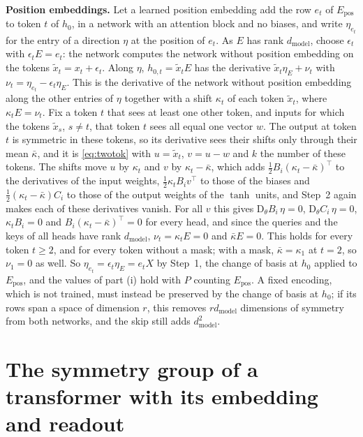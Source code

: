 \documentclass[10pt]{article}
\theoremstyle{definition}
\theoremstyle{remark}
\newcommand{\dm}{d_{\mathrm{model}}}
\newcommand{\Der}{\mathrm{D}}
\newcommand{\para}[1]{\smallskip\noindent\textbf{#1}\hspace{0.5em}}
\begin{document}
\para{Position embeddings.} Let a learned position embedding add the row $e_t$ of $E_{\mathrm{pos}}$ to token $t$ of $h_0$, in a network with an attention block and no biases, and write $\eta_{e_t}$ for the entry of a direction $\eta$ at the position of $e_t$. As $E$ has rank $\dm$, choose $\epsilon_t$ with $\epsilon_tE = e_t$: the network computes the network without position embedding on the tokens $\tilde x_t = x_t + \epsilon_t$. Along $\eta$, $h_{0,t} = \tilde x_tE$ has the derivative $\tilde x_t\eta_E + \nu_t$ with $\nu_t = \eta_{e_t} - \epsilon_t\eta_E$. This is the derivative of the network without position embedding along the other entries of $\eta$ together with a shift $\kappa_t$ of each token $\tilde x_t$, where $\kappa_tE = \nu_t$. Fix a token $t$ that sees at least one other token, and inputs for which the tokens $\tilde x_s$, $s \neq t$, that token $t$ sees all equal one vector $w$. The output at token $t$ is symmetric in these tokens, so its derivative sees their shifts only through their mean $\bar\kappa$, and it is \cref{eq:twotok} with $u = \tilde x_t$, $v = u - w$ and $k$ the number of these tokens. The shifts move $u$ by $\kappa_t$ and $v$ by $\kappa_t - \bar\kappa$, which adds $\tfrac12B_i(\kappa_t - \bar\kappa)^\top$ to the derivatives of the input weights, $\tfrac12\kappa_tB_iv^\top$ to those of the biases and $\tfrac12(\kappa_t - \bar\kappa)C_i$ to those of the output weights of the $\tanh$ units, and Step~2 again makes each of these derivatives vanish. For all $v$ this gives $\Der_\theta B_i\,\eta = 0$, $\Der_\theta C_i\,\eta = 0$, $\kappa_tB_i = 0$ and $B_i(\kappa_t - \bar\kappa)^\top = 0$ for every head, and since the queries and the keys of all heads have rank $\dm$, $\nu_t = \kappa_tE = 0$ and $\bar\kappa E = 0$. This holds for every token $t \ge 2$, and for every token without a mask; with a mask, $\bar\kappa = \kappa_1$ at $t = 2$, so $\nu_1 = 0$ as well. So $\eta_{e_t} = \epsilon_t\eta_E = e_tX$ by Step~1, the change of basis at $h_0$ applied to $E_{\mathrm{pos}}$, and the values of part (i) hold with $P$ counting $E_{\mathrm{pos}}$. A fixed encoding, which is not trained, must instead be preserved by the change of basis at $h_0$; if its rows span a space of dimension $r$, this removes $r\dm$ dimensions of symmetry from both networks, and the skip still adds $\dm^2$.


\FloatBarrier
\section{The symmetry group of a transformer with its embedding and readout}\label{app:product}
\end{document}
